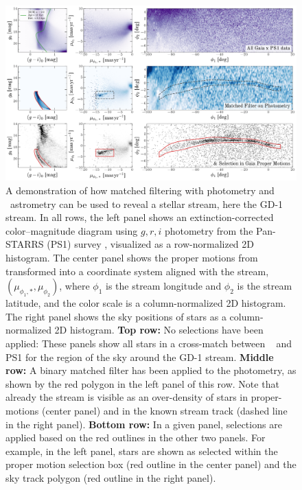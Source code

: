 \documentclass[final,5p,times,twocolumn,authoryear]{elsarticle}
\begin{document}
\begin{figure}[t!]
    \begin{center}
    \includegraphics[width=1\textwidth]{gd1-filter-demo.pdf}
    \end{center}
    \caption{%
    A demonstration of how matched filtering with photometry and \gaia\ astrometry can
    be used to reveal a stellar stream, here the GD-1 stream.
    In all rows, the left panel shows an extinction-corrected color--magnitude diagram
    using $g, r, i$ photometry from the Pan-STARRS (PS1) survey \citep{chambers:2016},
    visualized as a row-normalized 2D histogram.
    The center panel shows the proper motions from \gaia\  \citep{gaiadr3}
    transformed into a coordinate system aligned with the stream, $(\mu_{\phi_1, *},
    \mu_{\phi_2})$, where $\phi_1$ is the stream longitude and $\phi_2$ is the stream
    latitude, and the color scale is a column-normalized 2D histogram.
    The right panel shows the sky positions of stars as a column-normalized 2D
    histogram.
    \textbf{Top row:} No selections have been applied: These panels show all stars in a
    cross-match between \gaia\  and PS1 for the region of the sky around the GD-1
    stream.
    \textbf{Middle row:} A binary matched filter has been applied to the photometry, as
    shown by the red polygon in the left panel of this row.
    Note that already the stream is visible as an over-density of stars in
    proper-motions (center panel) and in the known stream track (dashed line in the
    right panel).
    \textbf{Bottom row:} In a given panel, selections are applied based on the red
    outlines in the other two panels.
    For example, in the left panel, stars are shown as selected within the proper motion
    selection box (red outline in the center panel) and the sky track polygon (red
    outline in the right panel).
    \label{fig:gd1-demo}
    }
\end{figure}
\end{document}
